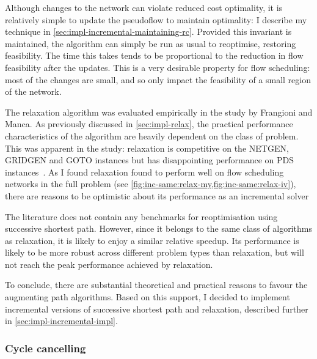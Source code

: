 Although changes to the network can violate reduced cost optimality, it is relatively simple to update the pseudoflow to maintain optimality: I describe my technique in \cref{sec:impl-incremental-maintaining-rc}. Provided this invariant is maintained, the algorithm can simply be run as usual to reoptimise, restoring feasibility. The time this takes tends to be proportional to the reduction in flow feasibility after the updates\footnotemark. This is a very desirable property for flow scheduling: most of the changes are small, and so only impact the feasibility of a small region of the network.

The relaxation algorithm was evaluated empirically in the study by Frangioni and Manca. As previously discussed in \cref{sec:impl-relax}, the practical performance characteristics of the algorithm are heavily dependent on the class of problem. This was apparent in the study: relaxation is competitive on the NETGEN, GRIDGEN and GOTO instances but has disappointing performance on PDS instances~\cite[tables~1~to~4]{Frangioni:2006}. As I found relaxation found to perform well on flow scheduling networks in the full problem (see \cref{fig:inc-same:relax-my,fig:inc-same:relax-iv}), there are reasons to be optimistic about its performance as an incremental solver

The literature does not contain any benchmarks for reoptimisation using successive shortest path. However, since it belongs to the same class of algorithms as relaxation, it is likely to enjoy a similar relative speedup. Its performance is likely to be more robust across different problem types than relaxation, but will not reach the peak performance achieved by relaxation.

To conclude, there are substantial theoretical and practical reasons to favour the augmenting path algorithms. Based on this support, I decided to implement incremental versions of successive shortest path and relaxation, described further in \cref{sec:impl-incremental-impl}.

\subsubsection{Cycle cancelling}

